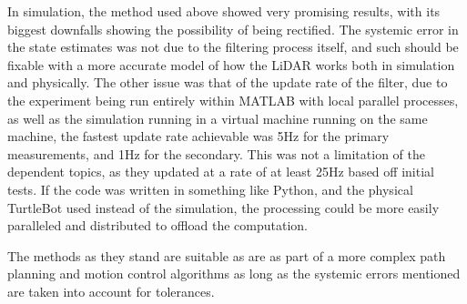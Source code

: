 In simulation, the method used above showed very promising results, with its biggest downfalls showing the possibility of being rectified. The systemic error in the state estimates was not due to the filtering process itself, and such should be fixable with a more accurate model of how the LiDAR works both in simulation and physically. The other issue was that of the update rate of the filter, due to the experiment being run entirely within MATLAB with local parallel processes, as well as the simulation running in a virtual machine running on the same machine, the fastest update rate achievable was 5Hz for the primary measurements, and 1Hz for the secondary. This was not a limitation of the dependent topics, as they updated at a rate of at least 25Hz based off initial tests. If the code was written in something like Python, and the physical TurtleBot used instead of the simulation, the processing could be more easily paralleled and distributed to offload the computation.\par
The methods as they stand are suitable as are as part of a more complex path planning and motion control algorithms as long as the systemic errors mentioned are taken into account for tolerances.